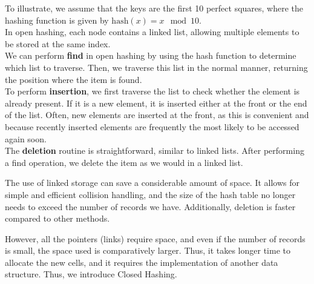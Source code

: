 \begin{minipage}{0.7\textwidth}
To illustrate, we assume that the keys are the first 10 perfect squares, where the hashing function is given by \(\text{hash}(x) = x \mod 10\).\\[3pt]
In open hashing, each node contains a linked list, allowing multiple elements to be stored at the same index.\\[3pt]
We can perform \textbf{find} in open hashing by using the hash function to determine which list to traverse. Then, we traverse this list in the normal manner, returning the position where the item is found.\\[3pt]
To perform \textbf{insertion}, we first traverse the list to check whether the element is already present. If it is a new element, it is inserted either at the front or the end of the list. Often, new elements are inserted at the front, as this is convenient and because recently inserted elements are frequently the most likely to be accessed again soon.\\[3pt]
The \textbf{deletion} routine is straightforward, similar to linked lists. After performing a find operation, we delete the item as we would in a linked list.
\end{minipage}
\begin{minipage}{0.3\textwidth}
\begin{center}
\end{center}
\end{minipage}

The use of linked storage can save a considerable amount of space. It allows for simple and efficient collision handling, and the size of the hash table no longer needs to exceed the number of records we have. Additionally, deletion is faster compared to other methods.

However, all the pointers (links) require space, and even if the number of records is small, the space used is comparatively larger. Thus, it takes longer time to allocate the new cells, and it requires the implementation of another data structure. Thus, we introduce Closed Hashing.

